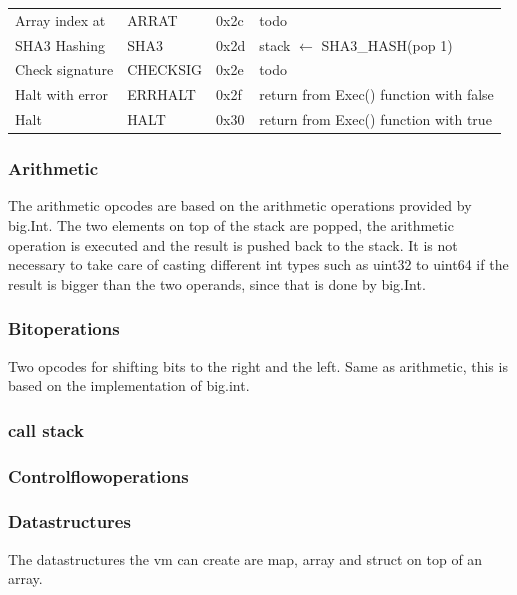 \begin{table}[]
\begin{tabular}{@{}llll@{}}
Array index at       & ARRAT             & 0x2c            & todo                                                     \\
SHA3 Hashing         & SHA3              & 0x2d            & stack $\leftarrow$ SHA3\_HASH(pop 1)                                \\
Check signature      & CHECKSIG          & 0x2e            & todo                                                     \\
Halt with error      & ERRHALT           & 0x2f            & return from Exec() function with false                   \\
Halt                 & HALT              & 0x30            & return from Exec() function with true                    \\ \bottomrule
\end{tabular}
\end{table}

\subsubsection{Arithmetic}
The arithmetic opcodes are based on the arithmetic operations provided by big.Int. The two elements on top of the stack are popped, the arithmetic operation is executed and the result is pushed back to the stack. It is not necessary to take care of casting different int types such as uint32 to uint64 if the result is bigger than the two operands, since that is done by big.Int.

\subsubsection{Bitoperations}
Two opcodes for shifting bits to the right and the left. Same as arithmetic, this is based on the implementation of big.int.

\subsubsection{call stack}

\subsubsection{Controlflowoperations}

\subsubsection{Datastructures}
The datastructures the vm can create are map, array and struct on top of an array. 

